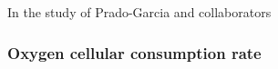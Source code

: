 \documentclass[11pt,a4paper]{article}
\begin{document}
In the study of Prado-Garcia and collaborators 


 
 
 
 
 
\subsubsection{Oxygen cellular consumption rate}
\end{document}
